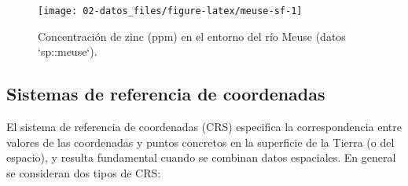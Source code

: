\documentclass[
  spanish,
]{book}
\theoremstyle{break}
\begin{document}
\begin{figure}[!htb]

{\centering \texttt{[image: 02-datos\_files/figure-latex/meuse-sf-1]} 

}

\caption{Concentración de zinc (ppm) en el entorno del río Meuse (datos `sp::meuse`).}\label{fig:meuse-sf}
\end{figure}

\hypertarget{crs}{%
\subsection{Sistemas de referencia de coordenadas}\label{crs}}

El sistema de referencia de coordenadas (CRS) especifica la correspondencia entre valores de las coordenadas y puntos concretos en la superficie de la Tierra (o del espacio), y resulta fundamental cuando se combinan datos espaciales.
En general se consideran dos tipos de CRS:
\end{document}
